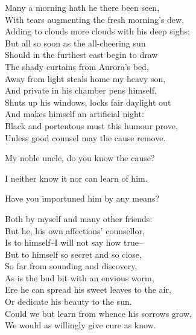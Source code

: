 \begin{speech}
 Many a morning hath he there been seen, \\
With tears augmenting the fresh morning's dew, \\
Adding to clouds more clouds with his deep sighs; \\
But all so soon as the all-cheering sun \\
Should in the furthest east begin to draw \\
The shady curtains from Aurora's bed, \\
Away from light steals home my heavy son, \\
And private in his chamber pens himself, \\
Shuts up his windows, locks fair daylight out \\
And makes himself an artificial night: \\
Black and portentous must this humour prove, \\
Unless good counsel may the cause remove. \\
\end{speech}
\begin{speech}
My noble uncle, do you know the cause? \\
\end{speech}
\begin{speech}
 I neither know it nor can learn of him. \\
\end{speech}
\begin{speech}
Have you importuned him by any means? \\
\end{speech}
\begin{speech}
Both by myself and many other friends: \\
But he, his own affections' counsellor, \\
Is to himself--I will not say how true-- \\
But to himself so secret and so close, \\
So far from sounding and discovery, \\
As is the bud bit with an envious worm, \\
Ere he can spread his sweet leaves to the air, \\
Or dedicate his beauty to the sun. \\
Could we but learn from whence his sorrows grow, \\
We would as willingly give cure as know.  \\

\end{speech}
